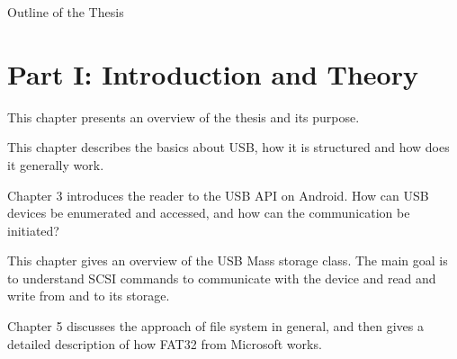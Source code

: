 \clearemptydoublepage

{}

\begin{center}
	\huge{Outline of the Thesis}
\end{center}




\section*{Part I: Introduction and Theory}

  \vspace{1mm}

\noindent  This chapter presents an overview of the thesis and its purpose. \\

  \vspace{1mm}

\noindent  This chapter describes the basics about USB, how it is structured and how does it generally work.   \\

  \vspace{1mm}

\noindent  Chapter 3 introduces the reader to the USB API on Android. How can USB devices be enumerated and accessed, and how can the communication be initiated? \\

  \vspace{1mm}

\noindent  This chapter gives an overview of the USB Mass storage class. The main goal is to understand SCSI commands to communicate with the device and read and write from and to its storage. \\

  \vspace{1mm}

\noindent  Chapter 5 discusses the approach of file system in general, and then gives a detailed description of how FAT32 from Microsoft works. \\

